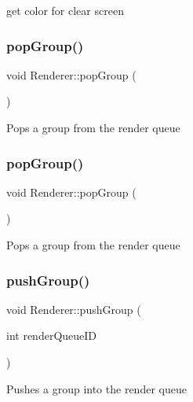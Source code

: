 get color for clear screen \mbox{\label{classRenderer_a76f0edf8fec541dd32f4c188bd5469de}} 
\subsubsection{\texorpdfstring{pop\+Group()}{popGroup()}\hspace{0.1cm}{\footnotesize\ttfamily [1/2]}}
{\footnotesize\ttfamily void Renderer\+::pop\+Group (\begin{DoxyParamCaption}{ }\end{DoxyParamCaption})}

Pops a group from the render queue \mbox{\label{classRenderer_a76f0edf8fec541dd32f4c188bd5469de}} 
\subsubsection{\texorpdfstring{pop\+Group()}{popGroup()}\hspace{0.1cm}{\footnotesize\ttfamily [2/2]}}
{\footnotesize\ttfamily void Renderer\+::pop\+Group (\begin{DoxyParamCaption}{ }\end{DoxyParamCaption})}

Pops a group from the render queue \mbox{\label{classRenderer_aa2da1f3530bf2033be91a1d1489bbb57}} 
\subsubsection{\texorpdfstring{push\+Group()}{pushGroup()}\hspace{0.1cm}{\footnotesize\ttfamily [1/2]}}
{\footnotesize\ttfamily void Renderer\+::push\+Group (\begin{DoxyParamCaption}\item[{int}]{render\+Queue\+ID }\end{DoxyParamCaption})}

Pushes a group into the render queue \mbox{\label{classRenderer_aa2da1f3530bf2033be91a1d1489bbb57}} 
